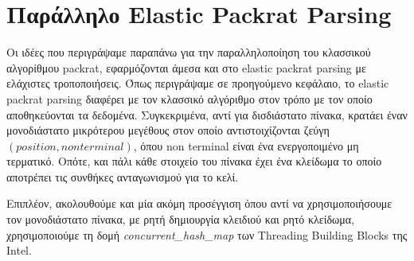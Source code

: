 \section{Παράλληλο Elastic Packrat Parsing}
Οι ιδέες που περιγράψαμε παραπάνω για την παραλληλοποίηση του κλασσικού αλγορίθμου packrat, εφαρμόζονται άμεσα και στο elastic packrat parsing με ελάχιστες τροποποιήσεις.
Όπως περιγράψαμε σε προηγούμενο κεφάλαιο, το elastic packrat parsing διαφέρει με τον κλασσικό αλγόριθμο στον τρόπο με τον οποίο αποθηκεύονται τα δεδομένα.
Συγκεκριμένα, αντί για δισδιάστατο πίνακα, κρατάει έναν μονοδιάστατο μικρότερου μεγέθους στον οποίο αντιστοιχίζονται ζεύγη $(position, non terminal)$, όπου non terminal είναι ένα ενεργοποιμένο μη τερματικό.
Οπότε, και πάλι κάθε στοιχείο του πίνακα έχει ένα κλείδωμα το οποίο αποτρέπει τις συνθήκες ανταγωνισμού για το κελί.

Επιπλέον, ακολουθούμε και μία ακόμη προσέγγιση όπου αντί να χρησιμοποιήσουμε τον μονοδιάστατο πίνακα, με ρητή δημιουργία κλειδιού και ρητό κλείδωμα, χρησιμοποιούμε τη δομή \textit{concurrent\_hash\_map} των Threading Building Blocks της Intel.
